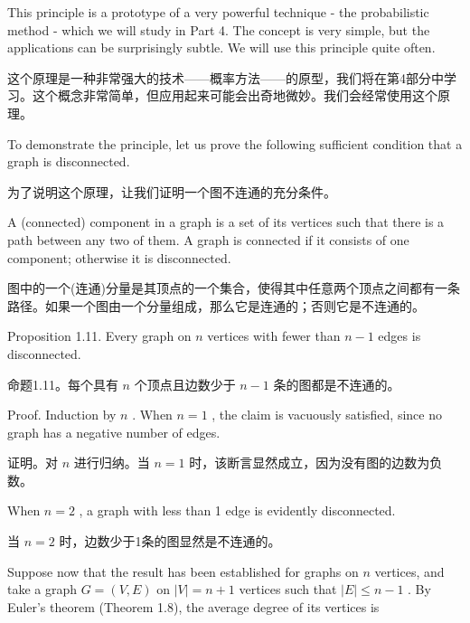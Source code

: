 \documentclass[10pt]{article}
\begin{document}
This principle is a prototype of a very powerful technique - the probabilistic method - which we will study in Part 4. The concept is very simple, but the applications can be surprisingly subtle. We will use this principle quite often.

\begin{tcolorbox}\relax
这个原理是一种非常强大的技术——概率方法——的原型，我们将在第4部分中学习。这个概念非常简单，但应用起来可能会出奇地微妙。我们会经常使用这个原理。
\end{tcolorbox}

To demonstrate the principle, let us prove the following sufficient condition that a graph is disconnected.

\begin{tcolorbox}\relax
为了说明这个原理，让我们证明一个图不连通的充分条件。
\end{tcolorbox}

A (connected) component in a graph is a set of its vertices such that there is a path between any two of them. A graph is connected if it consists of one component; otherwise it is disconnected.

\begin{tcolorbox}\relax
图中的一个(连通)分量是其顶点的一个集合，使得其中任意两个顶点之间都有一条路径。如果一个图由一个分量组成，那么它是连通的；否则它是不连通的。
\end{tcolorbox}

Proposition 1.11. Every graph on \(n\) vertices with fewer than \(n - 1\) edges is disconnected.

\begin{tcolorbox}\relax
命题1.11。每个具有 \(n\) 个顶点且边数少于 \(n - 1\) 条的图都是不连通的。
\end{tcolorbox}

Proof. Induction by \(n\) . When \(n = 1\) , the claim is vacuously satisfied, since no graph has a negative number of edges.

\begin{tcolorbox}\relax
证明。对 \(n\) 进行归纳。当 \(n = 1\) 时，该断言显然成立，因为没有图的边数为负数。
\end{tcolorbox}

When \(n = 2\) , a graph with less than 1 edge is evidently disconnected.

\begin{tcolorbox}\relax
当 \(n = 2\) 时，边数少于1条的图显然是不连通的。
\end{tcolorbox}

Suppose now that the result has been established for graphs on \(n\) vertices, and take a graph \(G = \left( {V,E}\right)\) on \(\left| V\right|  = n + 1\) vertices such that \(\left| E\right|  \leq  n - 1\) . By Euler's theorem (Theorem 1.8), the average degree of its vertices is
\end{document}
